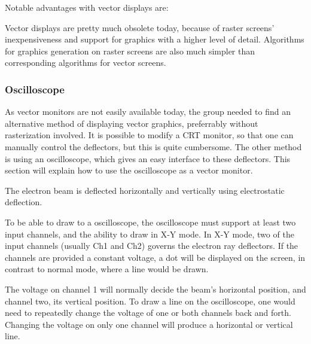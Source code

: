 Notable advantages with vector displays are:

Vector displays are pretty much obsolete today, because of raster screens' inexpensiveness and support for graphics with a higher level of detail. Algorithms for graphics generation on raster screens are also much simpler than corresponding algorithms for vector screens.

\subsubsection{Oscilloscope}
As vector monitors are not easily available today, the group needed to find an alternative method of displaying vector graphics, preferrably without rasterization involved.
It is possible to modify a CRT monitor, so that one can manually control the deflectors, but this is quite cumbersome.
The other method is using an oscilloscope, which gives an easy interface to these deflectors.
This section will explain how to use the oscilloscope as a vector monitor.

The electron beam is deflected horizontally and vertically using electrostatic deflection. \cite{vector-monitor}

To be able to draw to a oscilloscope, the oscilloscope must support at least two input channels, and the ability to draw in X-Y mode.
In X-Y mode, two of the input channels (usually Ch1 and Ch2) governs the electron ray deflectors.
If the channels are provided a constant voltage, a dot will be displayed on the screen, in contrast to normal mode, where  a line would be drawn.

The voltage on channel 1 will normally decide the beam's horizontal position, and channel two, its vertical position.
To draw a line on the oscilloscope, one would need to repeatedly change the voltage of one or both channels back and forth.
Changing the voltage on only one channel will produce a horizontal or vertical line.
